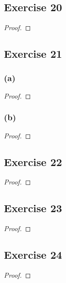 \documentclass[14pt]{extarticle}
\begin{document}
\subsection{Exercise 20}

\begin{proof}

\end{proof}

\subsection{Exercise 21}

\subsubsection{(a)}

\begin{proof}

\end{proof}

\subsubsection{(b)}

\begin{proof}

\end{proof}

\subsection{Exercise 22}

\begin{proof}

\end{proof}

\subsection{Exercise 23}

\begin{proof}

\end{proof}

\subsection{Exercise 24}

\begin{proof}

\end{proof}
\end{document}
